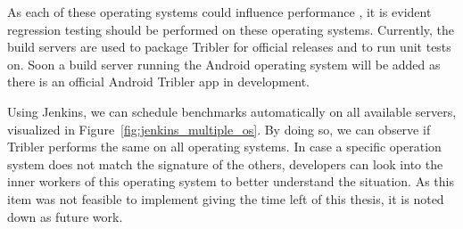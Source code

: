 As each of these operating systems could influence performance \cite{gupta1991impact}, it is evident regression testing should be performed on these operating systems.
Currently, the build servers are used to package Tribler for official releases and to run unit tests on.
Soon a build server running the Android operating system will be added as there is an official Android Tribler app in development.

Using Jenkins, we can schedule benchmarks automatically on all available servers, visualized in Figure~\ref{fig:jenkins_multiple_os}.
By doing so, we can observe if Tribler performs the same on all operating systems.
In case a specific operation system does not match the signature of the others, developers can look into the inner workers of this operating system to better understand the situation.
As this item was not feasible to implement giving the time left of this thesis, it is noted down as future work.
